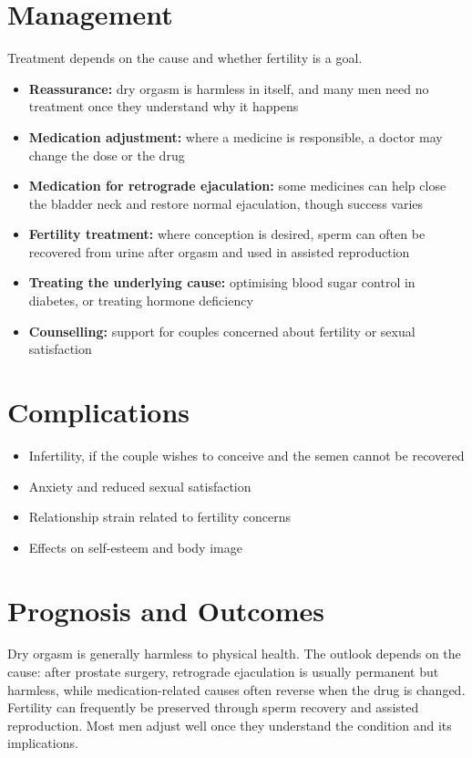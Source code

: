 \section*{Management}
Treatment depends on the cause and whether fertility is a goal.
\begin{itemize}
    \item \textbf{Reassurance:} dry orgasm is harmless in itself, and many men need no treatment once they understand why it happens
    \item \textbf{Medication adjustment:} where a medicine is responsible, a doctor may change the dose or the drug
    \item \textbf{Medication for retrograde ejaculation:} some medicines can help close the bladder neck and restore normal ejaculation, though success varies
    \item \textbf{Fertility treatment:} where conception is desired, sperm can often be recovered from urine after orgasm and used in assisted reproduction
    \item \textbf{Treating the underlying cause:} optimising blood sugar control in diabetes, or treating hormone deficiency
    \item \textbf{Counselling:} support for couples concerned about fertility or sexual satisfaction
\end{itemize}

\section*{Complications}
\begin{itemize}
    \item Infertility, if the couple wishes to conceive and the semen cannot be recovered
    \item Anxiety and reduced sexual satisfaction
    \item Relationship strain related to fertility concerns
    \item Effects on self-esteem and body image
\end{itemize}

\section*{Prognosis and Outcomes}
Dry orgasm is generally harmless to physical health. The outlook depends on the cause: after prostate surgery, retrograde ejaculation is usually permanent but harmless, while medication-related causes often reverse when the drug is changed. Fertility can frequently be preserved through sperm recovery and assisted reproduction. Most men adjust well once they understand the condition and its implications.

